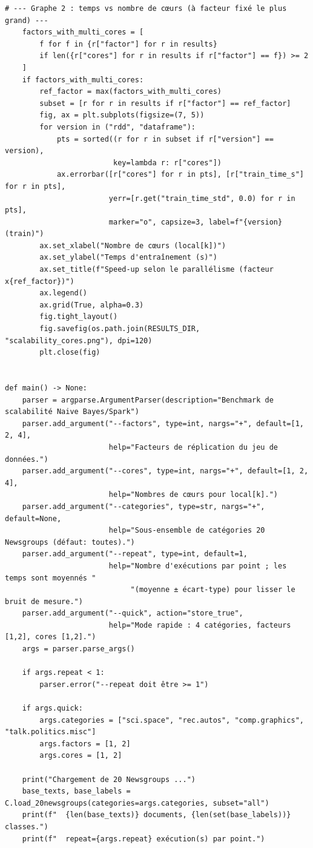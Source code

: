 \begin{lstlisting}[style=py]
    # --- Graphe 2 : temps vs nombre de cœurs (à facteur fixé le plus grand) ---
    factors_with_multi_cores = [
        f for f in {r["factor"] for r in results}
        if len({r["cores"] for r in results if r["factor"] == f}) >= 2
    ]
    if factors_with_multi_cores:
        ref_factor = max(factors_with_multi_cores)
        subset = [r for r in results if r["factor"] == ref_factor]
        fig, ax = plt.subplots(figsize=(7, 5))
        for version in ("rdd", "dataframe"):
            pts = sorted((r for r in subset if r["version"] == version),
                         key=lambda r: r["cores"])
            ax.errorbar([r["cores"] for r in pts], [r["train_time_s"] for r in pts],
                        yerr=[r.get("train_time_std", 0.0) for r in pts],
                        marker="o", capsize=3, label=f"{version} (train)")
        ax.set_xlabel("Nombre de cœurs (local[k])")
        ax.set_ylabel("Temps d'entraînement (s)")
        ax.set_title(f"Speed-up selon le parallélisme (facteur x{ref_factor})")
        ax.legend()
        ax.grid(True, alpha=0.3)
        fig.tight_layout()
        fig.savefig(os.path.join(RESULTS_DIR, "scalability_cores.png"), dpi=120)
        plt.close(fig)


def main() -> None:
    parser = argparse.ArgumentParser(description="Benchmark de scalabilité Naive Bayes/Spark")
    parser.add_argument("--factors", type=int, nargs="+", default=[1, 2, 4],
                        help="Facteurs de réplication du jeu de données.")
    parser.add_argument("--cores", type=int, nargs="+", default=[1, 2, 4],
                        help="Nombres de cœurs pour local[k].")
    parser.add_argument("--categories", type=str, nargs="+", default=None,
                        help="Sous-ensemble de catégories 20 Newsgroups (défaut: toutes).")
    parser.add_argument("--repeat", type=int, default=1,
                        help="Nombre d'exécutions par point ; les temps sont moyennés "
                             "(moyenne ± écart-type) pour lisser le bruit de mesure.")
    parser.add_argument("--quick", action="store_true",
                        help="Mode rapide : 4 catégories, facteurs [1,2], cores [1,2].")
    args = parser.parse_args()

    if args.repeat < 1:
        parser.error("--repeat doit être >= 1")

    if args.quick:
        args.categories = ["sci.space", "rec.autos", "comp.graphics", "talk.politics.misc"]
        args.factors = [1, 2]
        args.cores = [1, 2]

    print("Chargement de 20 Newsgroups ...")
    base_texts, base_labels = C.load_20newsgroups(categories=args.categories, subset="all")
    print(f"  {len(base_texts)} documents, {len(set(base_labels))} classes.")
    print(f"  repeat={args.repeat} exécution(s) par point.")


\end{lstlisting}
